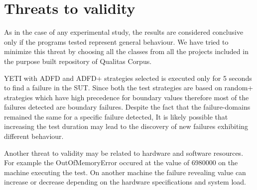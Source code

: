 \documentclass[conference]{IEEEtran}
\begin{document}



\section{Threats to validity} \label{sec:threat}
As in the case of any experimental study, the results are considered conclusive only if the programs tested represent general behaviour. We have tried to minimize this threat by choosing all the classes from all the projects included in the purpose built repository of Qualitas Corpus. 

YETI with ADFD and ADFD+ strategies selected is executed only for 5 seconds to find a failure in the SUT. Since both the test strategies are based on random+ strategies which have high precedence for boundary values therefore most of the failures detected are boundary failures. Despite the fact that the failure-domains remained the same for a specific failure detected, It is likely possible that increasing the test duration may lead to the discovery of new failures exhibiting different behaviour.

Another threat to validity may be related to hardware and software resources. For example the OutOfMemoryError occured at the value of 6980000 on the machine executing the test. On another machine the failure revealing value can increase or decrease depending on the hardware specifications and system load.










\end{document}
